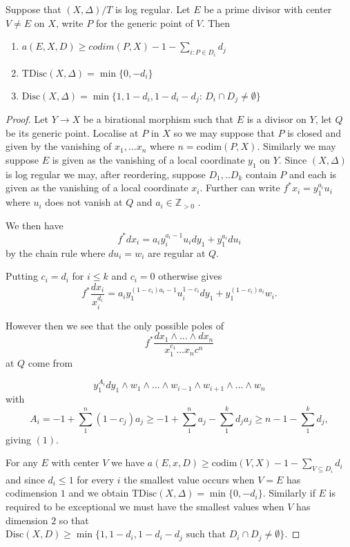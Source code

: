 \documentclass[a4paper,12pt]{book}
\begin{document}
\begin{lemma}
	Suppose that $(X,\Delta)/T$ is log regular. Let $E$ be a prime divisor with center $V\neq E$ on $X$, write $P$ for the generic point of $V$. 
	Then \begin{enumerate}
		\item $a(E,X,D)\geq codim(P,X) -1-\sum_{i: P\in D_{i}}d_{j}$
		\item $\text{TDisc}(X,\Delta)=\min\{0,-d_{i}\}$
		\item $\text{Disc}(X,\Delta) =\min\{1,1-d_{i},1-d_{i}-d_{j}\text{: } D_{i} \cap D_{j}\neq \emptyset\}$

	\end{enumerate}
\end{lemma}
\begin{proof}
	Let $Y \to X$ be a birational morphism such that $E$ is a divisor on $Y$, let $Q$ be its generic point. Localise at $P$ in $X$ so we may suppose that $P$ is closed and given by the vanishing of $x_{1},...x_{n}$ where $n=\text{codim}(P,X)$. Similarly we may suppose $E$ is given as the vanishing of a local coordinate $y_{1}$ on $Y$. Since $(X,\Delta)$ is log regular we may, after reordering, suppose $D_{1},..D_{k}$ contain $P$ and each is given as the vanishing of a local coordinate $x_{i}$. Further can write $f^{*}x_{i}=y_{1}^{a_{i}}u_{i}$ where $u_{i}$ does not vanish at $Q$ and $a_{i}\in \mathbb{Z}_{>0}$ .
	
	We then have $$f^{*}dx_{i}=a_{i}y_{i}^{a_{i}-1}u_{i}dy_{1} + y_{1}^{a_{i}}du_{i}$$ by the chain rule where $du_{i}=w_{i}$ are regular at $Q$.
	
	Putting $c_{i}=d_{i}$ for $i \leq k$ and $c_{i}=0$ otherwise gives
	$$f^{*}\frac{dx_{i}}{x_{i}^{d_{i}}}=a_{i}y_{1}^{(1-c_{i})a_{i}-1}u_{i}^{1-c_{i}}dy_{1} +y_{1}^{(1-c_{i})a_{i}}w_{i}.$$
	
	However then we see that the only possible poles of 
	$$f^{*}\frac{dx_{1}\wedge...\wedge dx_{n}}{x_{1}^{c_{1}}...x_{n}c^{n}}$$
	at $Q$ come from 
	
	$$y_{1}^{A_{i}}dy_{1}\wedge w_{1}\wedge ... \wedge w_{i-1} \wedge w_{i+1} \wedge... \wedge w_{n}$$
	with $$A_{i}=-1+ \sum_{1}^{n} (1-c_{j})a_{j} \geq -1+\sum _{1}^{n}a_{j} -\sum_{1}^{k} d_{j}a_{j} \geq n -1 - \sum_{1}^{k} d_{j},$$ giving $(1)$.
	
	For any $E$ with center $V$ we have $a(E,x,D) \geq \text{codim}(V,X) -1 - \sum_{V \subseteq D_{i}} d_{i}$ and since $d_{i} \leq 1$ for every $i$ the smallest value occurs when $V=E$ has codimension $1$ and we obtain $\text{TDisc}(X,\Delta)=\min\{0,-d_{i}\}$. Similarly if $E$ is required to be exceptional we must have the smallest values when $V$ has dimension $2$ so that $\text{Disc}(X,D)\geq \min\{1,1-d_{i},1-d_{i}-d_{j} \text{ such that }D_{i}\cap D_{j} \neq \emptyset\}$.
	

\end{proof}
\end{document}
